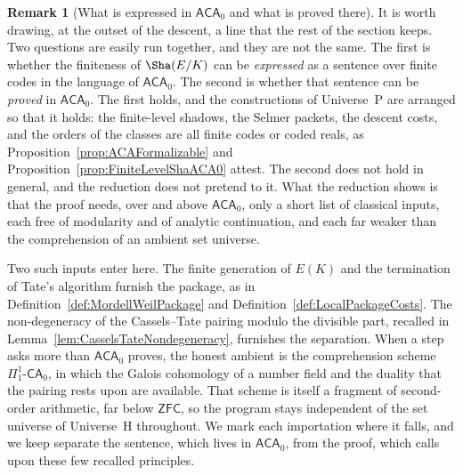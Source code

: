 \documentclass[10pt, reqno]{amsart}
\theoremstyle{plain}
\theoremstyle{definition}
\newtheorem{remark}[theorem]{Remark}
\theoremstyle{plain}
\begin{document}
\begin{remark}[What is expressed in $\mathsf{ACA}_{0}$ and what is proved there]
\label{rem:ExpressibilityVersusProvability}
It is worth drawing, at the outset of the descent, a line that the rest of the section keeps. Two questions are easily run together, and they are not the same. The first is whether the finiteness of $\Sha(E/K)$ can be \emph{expressed} as a sentence over finite codes in the language of $\mathsf{ACA}_{0}$. The second is whether that sentence can be \emph{proved} in $\mathsf{ACA}_{0}$. The first holds, and the constructions of Universe~P are arranged so that it holds: the finite-level shadows, the Selmer packets, the descent costs, and the orders of the classes are all finite codes or coded reals, as Proposition~\ref{prop:ACAFormalizable} and Proposition~\ref{prop:FiniteLevelShaACA0} attest. The second does not hold in general, and the reduction does not pretend to it. What the reduction shows is that the proof needs, over and above $\mathsf{ACA}_{0}$, only a short list of classical inputs, each free of modularity and of analytic continuation, and each far weaker than the comprehension of an ambient set universe.

Two such inputs enter here. The finite generation of $E(K)$ and the termination of Tate's algorithm furnish the package, as in Definition~\ref{def:MordellWeilPackage} and Definition~\ref{def:LocalPackageCosts}. The non-degeneracy of the Cassels--Tate pairing modulo the divisible part, recalled in Lemma~\ref{lem:CasselsTateNondegeneracy}, furnishes the separation. When a step asks more than $\mathsf{ACA}_{0}$ proves, the honest ambient is the comprehension scheme $\Pi^{1}_{1}\text{-}\mathsf{CA}_{0}$, in which the Galois cohomology of a number field and the duality that the pairing rests upon are available. That scheme is itself a fragment of second-order arithmetic, far below $\mathsf{ZFC}$, so the program stays independent of the set universe of Universe~H throughout. We mark each importation where it falls, and we keep separate the sentence, which lives in $\mathsf{ACA}_{0}$, from the proof, which calls upon these few recalled principles.


\end{remark}
\end{document}
